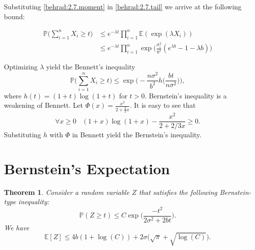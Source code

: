 \documentclass[]{article}
\newtheorem{theorem}{Theorem}
\newcommand{\E}{\mathbb{E}}
\newcommand{\Prob}{\mathbb{P}}
\begin{document}
Substituting \eqref{behrad:2.7.moment} in \eqref{behrad:2.7.tail} we arrive at the following bound:

\begin{align*}
\mathbb{P} \Big(\sum_{i = 1}^{n} X_i \geq t \Big) &\leq e^{-\lambda t} \prod_{i = 1}^{n} \E(\exp(\lambda X_i))\\
&\leq e^{-\lambda t} \prod_{i = 1}^{n} \exp\Big(\frac{\sigma_i^2}{b^2}(e^{\lambda b} - 1 - \lambda b)\Big)
\end{align*}

Optimizing $\lambda$ yield the Bennett's inequality
\begin{equation}
\Prob\Big(\sum_{i = 1}^{n} X_i \geq t\Big) \leq \exp\Big(-\frac{n\sigma^2}{b^2} h\Big(\frac{bt}{n\sigma^2}\Big)\Big) ,
\end{equation}
where $h(t) = (1+t) \log(1+t)$ for $t>0$. Bernstein's inequality is a weakening of Bennett. Let $\Phi(x) = \frac{x^2}{2 + \frac{2}{3} x}$. It is easy to see that
\begin{equation}
\forall x \geq 0 \;\;\; (1+x) \log(1+x) - \frac{x^2}{2 + 2/3 x} \geq 0.
\end{equation}
Substituting $h$ with $\Phi$ in Bennett yield the Bernstein's inequality.

\section{Bernstein's Expectation}
\begin{theorem}
	Consider a random variable $Z$ that satisfies the following Bernstein-type inequality:
	\begin{equation}
	\Prob(Z \geq t) \leq C \exp\Big(\frac{-t^2}{2\sigma^2 + 2bt}\Big).
	\end{equation}
	We have 
	\begin{equation}
	\E[Z] \leq 4b(1 + \log(C)) + 2\sigma \big(\sqrt{\pi} + \sqrt{\log(C)}\big).
	\end{equation}
\end{theorem}
\end{document}
